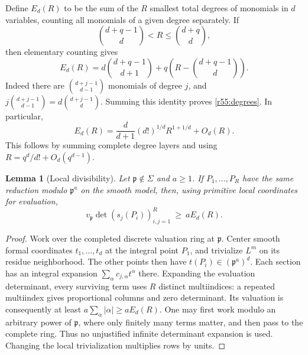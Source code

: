 \documentclass[11pt,a4paper]{article}
\newtheorem{notebooklemma}{Lemma}[section]
\numberwithin{equation}{section}
\begin{document}
Define $E_d(R)$ to be the sum of the $R$ smallest total degrees of monomials in $d$ variables, counting all monomials of a given degree separately. If
\[
 \binom{d+q-1}{d}<R\leq\binom{d+q}{d},
\]
then elementary counting gives
\begin{equation}\label{r55:degrees}
 E_d(R)=d\binom{d+q-1}{d+1}
       +q\left(R-\binom{d+q-1}{d}\right).
\end{equation}
Indeed there are $\binom{d+j-1}{d-1}$ monomials of degree $j$, and
$j\binom{d+j-1}{d-1}=d\binom{d+j-1}{d}$. Summing this identity proves \eqref{r55:degrees}. In particular,
\begin{equation}\label{r55:asymptotic}
 E_d(R)=\frac{d}{d+1}(d!)^{1/d}R^{1+1/d}+O_d(R).
\end{equation}
This follows by summing complete degree layers and using $R=q^d/d!+O_d(q^{d-1})$.

\begin{notebooklemma}[Local divisibility]\label{r55:local}
Let $\mathfrak p\notin\Sigma$ and $a\geq1$. If $P_1,\ldots,P_R$ have the same reduction modulo $\mathfrak p^a$ on the smooth model, then, using primitive local coordinates for evaluation,
\[
 v_{\mathfrak p}\det(s_j(P_i))_{i,j=1}^{R}\ \geq\ a E_d(R).
\]
\end{notebooklemma}
\begin{proof}
Work over the completed discrete valuation ring at $\mathfrak p$. Center smooth formal coordinates $t_1,\ldots,t_d$ at the integral point $P_1$, and trivialize $L^m$ on its residue neighborhood. The other points then have $t(P_i)\in(\mathfrak p^a)^d$. Each section has an integral expansion $\sum_{\alpha}c_{j,\alpha}t^\alpha$ there. Expanding the evaluation determinant, every surviving term uses $R$ distinct multiindices: a repeated multiindex gives proportional columns and zero determinant. Its valuation is consequently at least $a\sum_\alpha|\alpha|\geq aE_d(R)$. One may first work modulo an arbitrary power of $\mathfrak p$, where only finitely many terms matter, and then pass to the complete ring. Thus no unjustified infinite determinant expansion is used. Changing the local trivialization multiplies rows by units.
\end{proof}
\end{document}
